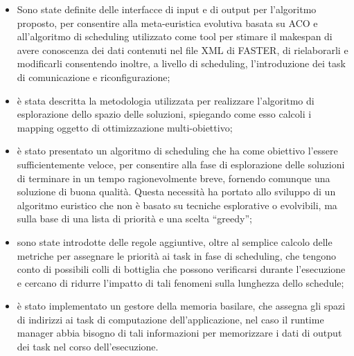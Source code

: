 \begin{itemize}
  \item Sono state definite delle interfacce di input e di output per 
      l'algoritmo proposto, per consentire alla meta-euristica evolutiva basata su \ac{ACO}
      e all'algoritmo di scheduling utilizzato come tool per stimare il makespan di avere conoscenza dei 
dati contenuti nel file XML di \ac{FASTER}, di rielaborarli e modificarli 
consentendo inoltre, a livello di scheduling, l'introduzione dei task di comunicazione e riconfigurazione;
\item \`e stata descritta la metodologia utilizzata per realizzare l'algoritmo di esplorazione
    dello spazio delle soluzioni, spiegando come esso calcoli i mapping oggetto di ottimizzazione
    multi-obiettivo;
 \item \`e stato presentato un algoritmo di scheduling che ha come obiettivo l'essere sufficientemente veloce, per 
consentire alla fase di esplorazione delle soluzioni di terminare in un tempo 
ragionevolmente breve, fornendo comunque una soluzione di buona qualit\`a. Questa necessità ha portato allo sviluppo di un algoritmo euristico
che non è basato su tecniche esplorative o evolvibili, ma sulla base di una 
lista di priorità e una scelta ``greedy'';
 \item sono state introdotte delle regole aggiuntive, oltre al semplice calcolo 
delle metriche per assegnare le priorità ai task in fase di scheduling, che tengono conto di 
possibili colli di bottiglia che possono verificarsi durante l'esecuzione e 
cercano di ridurre l'impatto di tali fenomeni sulla lunghezza dello schedule;
 \item è stato implementato un gestore della memoria basilare, che assegna gli spazi di
 indirizzi ai task di computazione dell'applicazione, nel caso il runtime manager abbia
 bisogno di tali informazioni per memorizzare i dati di output dei task nel corso
 dell'esecuzione.
\end{itemize}
